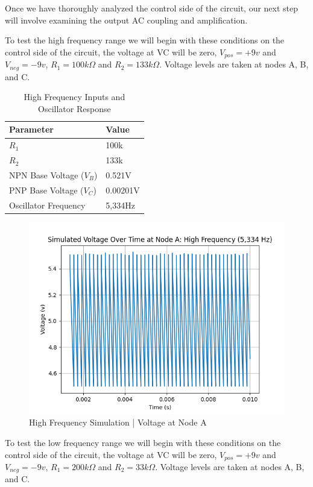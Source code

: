 \documentclass{article}
\begin{document}
Once we have thoroughly analyzed the control side of the circuit, our next step will involve examining the output AC coupling and amplification.

To test the high frequency range we will begin with these conditions on the control side of the circuit, the voltage at VC will be zero, $V_{pos} = +9 v$ and $V_{neg} = -9 v$, $R_1 = 100k \Omega$ and $R_2 = 133k \Omega$. Voltage levels are taken at nodes A, B, and C.

\begin{center}
  \begin{table}[H]
    \centering
    \begin{tabular}{ll}
    \toprule
    Parameter & Value \\
    \midrule
    $R_1$ & 100k \\
    $R_2$ & 133k \\
    NPN Base Voltage ($V_B$) & 0.521V \\
    PNP Base Voltage ($V_C$) & 0.00201V \\
    Oscillator Frequency & 5,334Hz \\
    \bottomrule
    \end{tabular}
    \caption{High Frequency Inputs and Oscillator Response}
    \end{table}
\end{center}
\vspace{-1.5cm}
\begin{figure}[H]
  \centering
  \includegraphics[width=.7\linewidth]{png/Figure_1.png}
  \caption{High Frequency Simulation | Voltage at Node A}
\end{figure}

To test the low frequency range we will begin with these conditions on the control side of the circuit, the voltage at VC will be zero, $V_{pos} = +9 v$ and $V_{neg} = -9 v$, $R_1 = 200k \Omega$ and $R_2 = 33k \Omega$. Voltage levels are taken at nodes A, B, and C.
\end{document}
